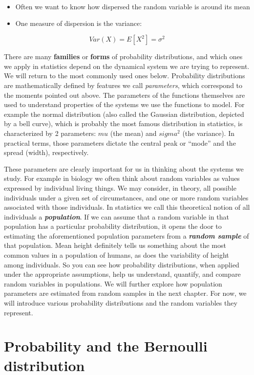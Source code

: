 \documentclass[]{book}
\providecommand{\tightlist}{%
  \setlength{\itemsep}{0pt}\setlength{\parskip}{0pt}}
\begin{document}
\begin{itemize}
\tightlist
\item
  Often we want to know how dispersed the random variable is around its mean
\item
  One measure of dispersion is the variance:
\end{itemize}

\[Var(X) = E[X^2] = \sigma^2\]

There are many \textbf{families} or \textbf{forms} of probability distributions, and which ones we apply in statistics depend on the dynamical system we are trying to represent. We will return to the most commonly used ones below. Probability distributions are mathematically defined by features we call \emph{parameters}, which correspond to the moments pointed out above. The parameters of the functions themselves are used to understand properties of the systems we use the functions to model. For example the normal distribution (also called the Gaussian distribution, depicted by a bell curve), which is probably the most famous distribution in statistics, is characterized by 2 parameters: \(mu\) (the mean) and \(sigma^{2}\) (the variance). In practical terms, those parameters dictate the central peak or ``mode'' and the spread (width), respectively.

These parameters are clearly important for us in thinking about the systems we study. For example in biology we often think about random variables as values expressed by individual living things. We may consider, in theory, all possible individuals under a given set of circumstances, and one or more random variables associated with those individuals. In statistics we call this theoretical notion of all individuals a \textbf{\emph{population}}. If we can assume that a random variable in that population has a particular probability distribution, it opens the door to estimating the aforementioned population parameters from a \textbf{\emph{random sample}} of that population. Mean height definitely tells us something about the most common values in a population of humans, as does the variability of height among individuals. So you can see how probability distributions, when applied under the appropriate assumptions, help us understand, quantify, and compare random variables in populations. We will further explore how population parameters are estimated from random samples in the next chapter. For now, we will introduce various probability distributions and the random variables they represent.

\hypertarget{probability-and-the-bernoulli-distribution}{%
\section{Probability and the Bernoulli distribution}\label{probability-and-the-bernoulli-distribution}}
\end{document}
